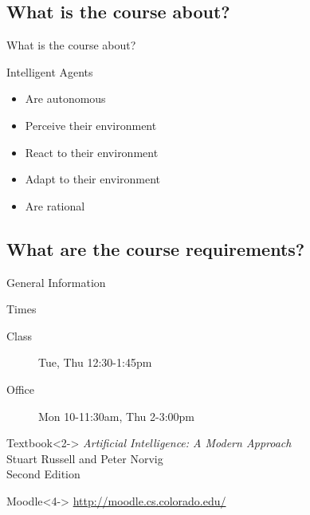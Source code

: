 \documentclass[12pt]{beamer}
\begin{document}
\subsection{What is the course about?}
\begin{frame}{What is the course about?}
	\begin{block}{Intelligent Agents}
		\begin{itemize}
			\item Are autonomous
			\item Perceive their environment
			\item React to their environment
			\item Adapt to their environment
			\item Are rational
		\end{itemize}
	\end{block}
\end{frame}

\subsection{What are the course requirements?}

\begin{frame}{General Information}
	\begin{block}{Times}
		\begin{description}
			\item[Class]  Tue, Thu 12:30-1:45pm \\
			\item[Office] Mon 10-11:30am, Thu 2-3:00pm
		\end{description}
	\end{block}
	\begin{block}{Textbook}<2->
		\textit{Artificial Intelligence: A Modern Approach} \\		
		Stuart Russell and Peter Norvig \\		
		Second Edition \uncover<3->{- \alert{Green, not red!}}
	\end{block}
	\begin{block}{Moodle}<4->
		\url{http://moodle.cs.colorado.edu/}
	\end{block}
\end{frame}
\end{document}
